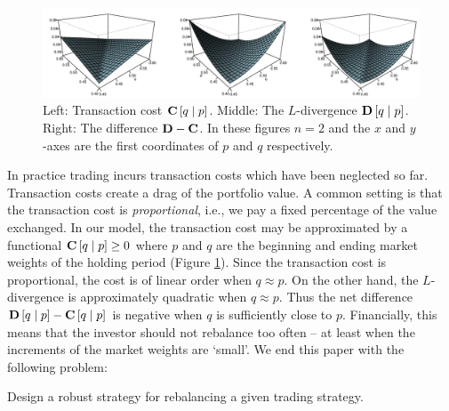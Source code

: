 \documentclass[graybox]{svmult}
\begin{document}
\begin{figure}[t!]
\centering
\includegraphics[scale=0.22]{divergence2.pdf}

\caption{Left: Transaction cost ${\bf C}\left[q \mid p\right]$. Middle: The $L$-divergence ${\bf D}\left[q \mid p\right]$. Right: The difference ${\bf D} - {\bf C}$. In these figures $n = 2$ and the $x$ and $y$-axes are the first coordinates of $p$ and $q$ respectively.} \label{fig:example1}
\end{figure}

In practice trading incurs transaction costs which have been neglected so far. Transaction costs create a drag of the portfolio value. A common setting is that the transaction cost is {\it proportional}, i.e., we pay a fixed percentage of the value exchanged. In our model, the transaction cost may be approximated by a functional ${\bf C}\left[q \mid p\right] \geq 0$ where $p$ and $q$ are the beginning and ending market weights of the holding period (Figure \ref{fig:example1}). Since the transaction cost is proportional, the cost is of linear order when $q \approx p$. On the other hand, the $L$-divergence is approximately quadratic when $q \approx p$.  Thus the net difference ${\bf D}\left[q \mid p\right] - {\bf C}\left[ q \mid p \right]$ is negative when $q$ is sufficiently close to $p$. Financially, this means that the investor should not rebalance too often -- at least when the increments of the market weights are `small'. We end this paper with the following problem:

\begin{problem}
Design a robust strategy for rebalancing a given trading strategy.
\end{problem}

%



\end{document}
